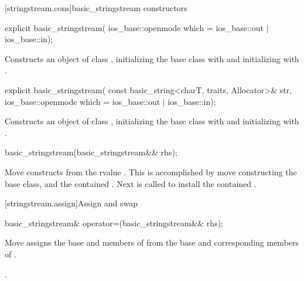 [stringstream.cons]{basic_stringstream constructors}

%
\begin{itemdecl}
explicit basic_stringstream(
  ios_base::openmode which = ios_base::out | ios_base::in);
\end{itemdecl}

\begin{itemdescr}
\pnum
\effects
Constructs an object of class
,
initializing the base class with
and initializing
with
.
\end{itemdescr}

%
\begin{itemdecl}
explicit basic_stringstream(
  const basic_string<charT, traits, Allocator>& str,
  ios_base::openmode which = ios_base::out | ios_base::in);
\end{itemdecl}

\begin{itemdescr}
\pnum
\effects
Constructs an object of class
,
initializing the base class with
and initializing
with
.
\end{itemdescr}

%
\begin{itemdecl}
basic_stringstream(basic_stringstream&& rhs);
\end{itemdecl}

\begin{itemdescr}
\pnum
\effects Move constructs from the rvalue . This
is accomplished by move constructing the base class, and the contained
.
Next  is called to
install the contained .
\end{itemdescr}

[stringstream.assign]{Assign and swap}

%
\begin{itemdecl}
basic_stringstream& operator=(basic_stringstream&& rhs);
\end{itemdecl}

\begin{itemdescr}
\pnum
\effects Move assigns the base and members of  from the base and corresponding
members of .

\pnum
\returns {}.
\end{itemdescr}

